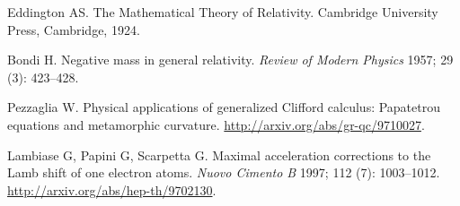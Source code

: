 \documentclass[12pt]{article}
\begin{document}
\begin{thebibliography}{99}

 Eddington AS. The Mathematical
Theory of Relativity. Cambridge University Press,
Cambridge, 1924. %

  Bondi H. Negative mass in general 
relativity. \textit{Review of Modern Physics} 1957; 
29 (3): 423--428. %

 Pezzaglia W. Physical applications of 
generalized Clifford calculus: Papatetrou equations 
and metamorphic curvature. \url{http://arxiv.org/abs/gr-qc/9710027}. 

  Lambiase G, Papini G,  Scarpetta G. 
Maximal acceleration corrections to the Lamb shift
of one electron atoms. \textit{Nuovo Cimento B} 1997; 
112 (7): 1003--1012. \url{http://arxiv.org/abs/hep-th/9702130}.

\end{thebibliography}


\end{document}

